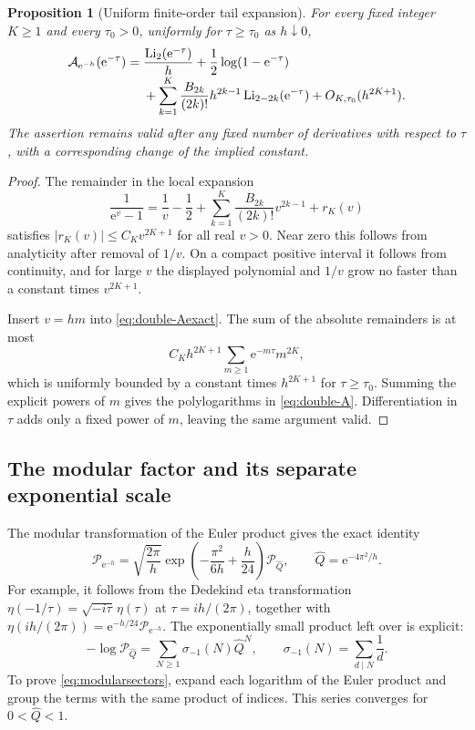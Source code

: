 \documentclass[11pt]{article}
\numberwithin{equation}{section}
\newtheorem{proposition}[theorem]{Proposition}
\theoremstyle{definition}
\newcommand{\Li}{\operatorname{Li}}
\newcommand{\ee}{\mathrm e}
\begin{document}
\begin{proposition}[Uniform finite-order tail expansion]\label{prop:double-A}
For every fixed integer $K\ge1$ and every $\tau_0>0$, uniformly for $\tau\ge\tau_0$ as $h\downarrow0$,
\begin{align}\label{eq:double-A}
 \mathcal A_{\ee^{-h}}(\ee^{-\tau})
 ={}&\frac{\Li_2(\ee^{-\tau})}{h}
     +\frac12\log(1-\ee^{-\tau})\\[-0.3em]
 &+\sum_{k=1}^K\frac{B_{2k}}{(2k)!}h^{2k-1}
          \Li_{2-2k}(\ee^{-\tau})
 +O_{K,\tau_0}(h^{2K+1}).\notag
\end{align}
The assertion remains valid after any fixed number of derivatives with respect to $\tau$, with a corresponding change of the implied constant.
\end{proposition}
\begin{proof}
The remainder in the local expansion
\[
 \frac1{\ee^v-1}=\frac1v-\frac12+
   \sum_{k=1}^K\frac{B_{2k}}{(2k)!}v^{2k-1}+r_K(v)
\]
satisfies $|r_K(v)|\le C_Kv^{2K+1}$ for all real $v>0$. Near zero this follows from analyticity after removal of $1/v$. On a compact positive interval it follows from continuity, and for large $v$ the displayed polynomial and $1/v$ grow no faster than a constant times $v^{2K+1}$.

Insert $v=hm$ into \eqref{eq:double-Aexact}. The sum of the absolute remainders is at most
\[
 C_Kh^{2K+1}\sum_{m\ge1}\ee^{-m\tau}m^{2K},
\]
which is uniformly bounded by a constant times $h^{2K+1}$ for $\tau\ge\tau_0$. Summing the explicit powers of $m$ gives the polylogarithms in \eqref{eq:double-A}. Differentiation in $\tau$ adds only a fixed power of $m$, leaving the same argument valid.
\end{proof}

\subsection{The modular factor and its separate exponential scale}

The modular transformation of the Euler product gives the exact identity \cite{dlmfqmod}
\begin{equation}\label{eq:modularP}
 \mathcal P_{\ee^{-h}}
 =\sqrt{\frac{2\pi}{h}}
   \exp\left(-\frac{\pi^2}{6h}+\frac h{24}\right)
   \mathcal P_{\widehat Q},
 \qquad \widehat Q=\ee^{-4\pi^2/h}.
\end{equation}
For example, it follows from the Dedekind eta transformation
$\eta(-1/\tau)=\sqrt{-i\tau}\,\eta(\tau)$ at $\tau=ih/(2\pi)$, together with
$\eta(ih/(2\pi))=\ee^{-h/24}\mathcal P_{\ee^{-h}}$.
The exponentially small product left over is explicit:
\begin{equation}\label{eq:modularsectors}
 -\log\mathcal P_{\widehat Q}
 =\sum_{N\ge1}\sigma_{-1}(N)\widehat Q^N,
 \qquad\sigma_{-1}(N)=\sum_{d\mid N}\frac1d.
\end{equation}
To prove \eqref{eq:modularsectors}, expand each logarithm of the Euler product and group the terms with the same product of indices. This series converges for $0<\widehat Q<1$.
\end{document}
